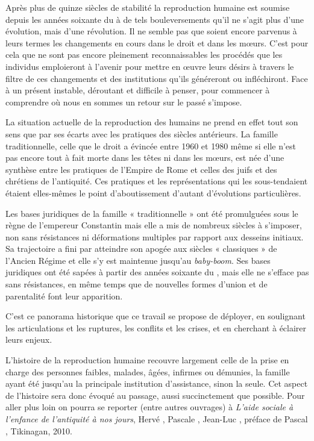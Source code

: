 Après plus de quinze siècles de stabilité la reproduction humaine
est soumise depuis les années soixante du  à de tels bouleversements
qu'il ne s'agit plus d'une évolution, mais d'une révolution. Il
ne semble pas que soient encore  parvenus à leurs termes les changements en
cours dans le droit et dans les mœurs. C'est pour cela que ne sont pas
encore pleinement reconnaissables les procédés que les individus emploieront
à l'avenir pour mettre en œuvre leurs désirs à travers le filtre
de ces changements et des institutions qu'ils généreront ou infléchiront.
Face à un présent instable, déroutant et difficile à penser, pour commencer à
comprendre où nous en sommes
 un retour sur le passé s'impose.

La situation actuelle de la reproduction des humains ne prend en
effet tout son sens que par ses écarts avec les pratiques des siècles antérieurs.
La famille traditionnelle, celle que le droit a évincée entre 1960 et
1980 même si elle n'est pas encore tout à fait morte dans les têtes ni dans les mœurs, est
née d'une synthèse entre les pratiques de l'Empire de Rome et celles des
juifs et des chrétiens de l'antiquité. Ces pratiques et les représentations
qui les sous-tendaient étaient elles-mêmes le point d'aboutissement
d'autant d'évolutions particulières.

Les bases juridiques de la famille « traditionnelle » ont été promulguées sous le règne
de l'empereur Constantin mais elle a mis de nombreux
siècles à s'imposer, non sans résistances ni déformations multiples par
rapport aux desseins initiaux. Sa trajectoire a fini par atteindre son apogée aux siècles « classiques »
de l'Ancien Régime et elle s'y est maintenue jusqu'au \emph{baby-boom}. Ses bases juridiques ont été sapées à partir des années soixante du , mais elle ne s'efface pas sans résistances, en
même temps que de nouvelles formes d'union et de parentalité font leur
apparition.

C'est ce panorama historique que ce travail se propose de déployer, en soulignant les articulations et les ruptures, les
conflits et les crises, et en cherchant à éclairer leurs enjeux.

L'histoire de la reproduction humaine recouvre largement celle
de la prise en charge des personnes faibles, malades, âgées, infirmes ou
démunies, la famille ayant été jusqu'au  la principale institution
d'assistance, sinon la seule. Cet aspect de l'histoire sera donc évoqué
au passage, aussi succinctement que possible. Pour aller plus loin on
pourra se reporter (entre autres ouvrages) à \emph{L'aide sociale à l'enfance de l'antiquité à
nos jours},%
Hervé , Pascale , Jean-Luc ,
préface de Pascal , Tikinagan, 2010.


